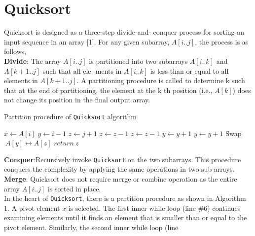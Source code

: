 \documentclass[a4paper, 15pt,twocolumn]{article}
\begin{document}
\section{Quicksort}
Quicksort is designed as a three-step divide-and-
conquer process for sorting an input sequence in
an array [1]. For any given subarray, $A[i..j]$, the
process is as follows,\\
\textbf{Divide}: The array $A[i..j]$ is partitioned into two
subarrays $A[i..k]$ and $A[k + 1..j]$ such that all ele-
ments in $A[i..k]$ is less than or equal to all elements
in $A[k + 1..j]$. A partitioning procedure is called to
determine k such that at the end of partitioning,
the element at the k th position (i.e., $A[k]$) does not
change its position in the final output array.
\\
\begin{algorithm}
  \caption{Partition procedure of \texttt{Quicksort} algorithm}
  \label{algo:ins_sort1}
  \begin{algorithmic}[1]
     \newline
     \newline
      \State $x \leftarrow A[i]$ 
      \State $y\leftarrow i-1$ 
      \State $z \leftarrow j+1$ 
          \State $z \leftarrow z-1$ 
            \State $z\leftarrow z-1$
         \EndWhile
      \State $y \leftarrow y + 1$
            \State $y \leftarrow y + 1$
      	\EndWhile
             \State Swap $\ A[y]\leftrightarrow A[z]$
         \Else 
      	     \State $return\ z$
         \EndIf
     \EndWhile
    \EndProcedure 
  \end{algorithmic}
\end{algorithm}
\textbf{Conquer}:Recursively invoke \texttt{Quicksort} on the two subarrays. This procedure conquers the complexity by applying the same operations in two sub-arrays.\\
\textbf{Merge}: Quicksort does not require merge or combine operation as the entire array $A[i..j]$ is sorted
in place.\\
In the heart of \texttt{Quicksort}, there is a partition
procedure as shown in Algorithm 1. A pivot element $x$ is selected. The first inner while loop (line
$\#$6) continues examining elements until it finds an
element that is smaller than or equal to the pivot element. Similarly, the second inner while loop (line
\end{document}
